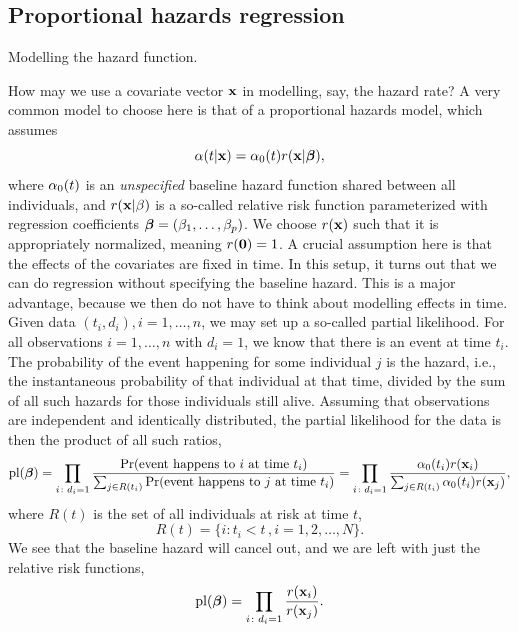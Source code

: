 \subsection{Proportional hazards regression}
Modelling the hazard function.

How may we use a covariate vector $\mathbf{x}$ in modelling, say, the hazard rate? A very common model to choose here is that of a proportional hazards model, which assumes
\begin{equation}\label{PH}
    \alpha(t|\mathbf{x})=\alpha_0(t)r(\mathbf{x}|\boldsymbol{\beta}),
\end{equation}
where $\alpha_0(t)$ is an \textit{unspecified} baseline hazard function shared between all individuals, and $r(\mathbf{x}|\beta)$ is a so-called relative risk function parameterized with regression coefficients $\boldsymbol{\beta}=(\beta_1,\ldots,\beta_p)$. We choose $r(\mathbf{x})$ such that it is appropriately normalized, meaning $r(\mathbf{0})=1$. A crucial assumption here is that the effects of the covariates are fixed in time. In this setup, it turns out that we can do regression without specifying the baseline hazard. This is a major advantage, because we then do not have to think about modelling effects in time. Given data $(t_i,d_i),i=1,\ldots,n$, we may set up a so-called partial likelihood.  For all observations $i=1,\ldots,n$ with $d_i=1$, we know that there is an event at time $t_i$. The probability of the event happening for some individual $j$ is the hazard, i.e., the instantaneous probability of that individual at that time, divided by the sum of all such hazards for those individuals still alive. Assuming that observations are independent and identically distributed, the partial likelihood for the data is then the product of all such ratios,
\begin{equation*}
    \operatorname{pl}(\boldsymbol{\beta})=\prod_{i\colon d_i=1}\frac{\Pr(\text{event happens to }i\text{ at time }t_i)}{\sum_{j\in R(t_i)}\Pr(\text{event happens to }j\text{ at time }t_i)}=\prod_{i\colon d_i=1}\frac{\alpha_0(t_i)r(\mathbf{x}_i)}{\sum_{j\in R(t_i)} \alpha_0(t_i)r(\mathbf{x}_j)},
\end{equation*}
where $R(t)$ is the set of all individuals at risk at time $t$,
\begin{equation*}
    R(t)=\{i\colon t_i<t\,,i=1,2,\ldots,N\}.
\end{equation*}
We see that the baseline hazard will cancel out, and we are left with just the relative risk functions,
\begin{equation*}
    \operatorname{pl}(\boldsymbol{\beta})=\prod_{i\colon d_i=1}\frac{r(\mathbf{x}_i)}{r(\mathbf{x}_j)}.
\end{equation*}

